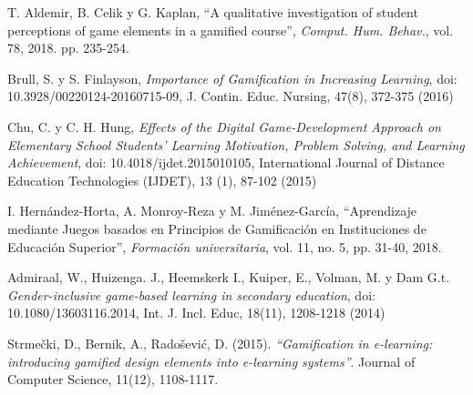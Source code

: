 \begin{thebibliography}{9}
        
        
        T. Aldemir, B. Celik y G. Kaplan, 
        ``A qualitative investigation of student perceptions of game elements in a gamified course'',
        {\it Comput. Hum. Behav.}, vol. 78, 2018. pp. 235-254.
        
        Brull, S. y S. Finlayson, 
        {\it Importance of Gamification in Increasing Learning},
        doi: 10.3928/00220124-20160715-09,
        J. Contin. Educ. Nursing, 47(8), 372-375 (2016)
    
        Chu, C. y C. H. Hung, 
        {\it Effects of the Digital Game-Development Approach on Elementary School Students’
        Learning Motivation, Problem Solving, and Learning Achievement}, doi: 10.4018/ijdet.2015010105,
        International Journal of Distance Education Technologies (IJDET), 13 (1), 87-102 (2015)
        
        I. Hernández-Horta, A. Monroy-Reza y M. Jiménez-García,   
        ``Aprendizaje mediante Juegos basados en Principios de Gamificación en Instituciones de Educación Superior'',
        {\it Formación universitaria}, vol. 11, no. 5, pp. 31-40, 2018.
        
        Admiraal, W., Huizenga. J., Heemskerk I., Kuiper, E., Volman, M. y Dam G.t.
        {\it Gender-inclusive game-based learning in secondary education},
        doi: 10.1080/13603116.2014, Int. J. Incl. Educ, 18(11), 1208-1218 (2014)

    
        Strmečki, D., Bernik, A., Radošević, D. (2015).
        {\it ``Gamification in e-learning: introducing gamified design elements into e-learning systems''}.
        Journal of Computer Science, 11(12), 1108-1117.


\end{thebibliography}
